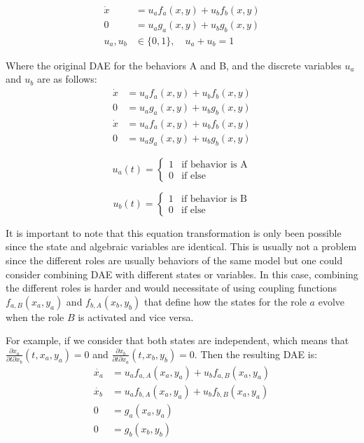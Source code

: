\documentclass{report}
\newcommand{\pder}[2]{\frac{\partial #1}{\partial #2}}
\begin{document}
\begin{align}
    \dot{x} &= u_a f_a(x,y) + u_b f_b(x,y) \\
    0 &= u_a g_a(x,y) + u_b g_b(x,y) \\
    u_a, u_b &\in \{0,1\}, \quad u_a + u_b = 1
\end{align}

Where the original DAE for the behaviors A and B, and the discrete variables 
$u_a$ and  $u_b$ are as follows:
\begin{align}
    \dot{x} &= u_a f_a(x,y) + u_b f_b(x,y) \\
    0 &= u_a g_a(x,y) + u_b g_b(x,y)
\end{align}
\begin{align}
    \dot{x} &= u_a f_a(x,y) + u_b f_b(x,y) \\
    0 &= u_a g_a(x,y) + u_b g_b(x,y)
\end{align}

\begin{minipage}[t]{0.45\textwidth}
    \[
    u_a(t) = \begin{cases}
        1 & \text{if behavior is A} \\
        0 & \text{if else} 
    \end{cases}
    \]
\end{minipage}
\hfill
\begin{minipage}[t]{0.45\textwidth}
    \[
    u_{b}(t) = \begin{cases}
        1 & \text{if behavior is B} \\
        0 & \text{if else} 
    \end{cases}
    \]
\end{minipage}

It is important to note that this equation transformation is only been possible since the state and algebraic variables are identical. This is usually not a problem since the different roles are usually behaviors of the same model but one could consider combining DAE with different states or variables. In this case, combining the different roles is harder and would necessitate of using coupling functions $f_{a,B}(x_a, y_a)$ and $f_{b,A}(x_b, y_b)$ that define how the states for the role $a$ evolve when the role $B$ is activated and vice versa.

For example, if we consider that both states are independent, which means that $\pder{x_a}{t \partial x_b}(t, x_a, y_a) = 0$ and $\pder{x_b}{t \partial x_a}(t, x_b, y_b) = 0$. Then the resulting DAE is:
\begin{align}
    \dot{x_a} &= u_a f_{a,A}(x_a,y_a) + u_b f_{a,B}(x_a, y_a) \\
    \dot{x_b} &= u_a f_{b,A}(x_a,y_a) + u_b f_{b,B}(x_a, y_a) \\
    0 &= g_{a}(x_a,y_a) \\
    0 &= g_{b}(x_b,y_b)
\end{align}
\end{document}
